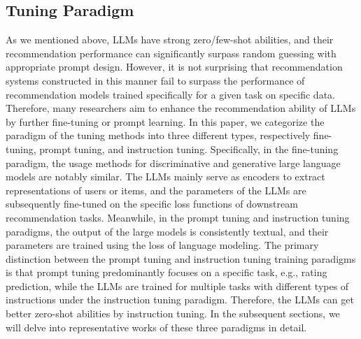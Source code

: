 \documentclass[sn-mathphys-num]{sn-jnl}%
\theoremstyle{thmstyleone}%
\theoremstyle{thmstyletwo}%
\theoremstyle{thmstylethree}%
\begin{document}
\subsection{Tuning Paradigm}
As we mentioned above, LLMs have strong zero/few-shot abilities, and their recommendation performance can significantly surpass random guessing with appropriate prompt design. However,  it is not surprising that recommendation systems constructed in this manner fail to surpass the performance of recommendation models trained specifically for a given task on specific data. Therefore, many researchers aim to enhance the recommendation ability of LLMs by further fine-tuning or prompt learning. In this paper, we categorize the paradigm of the tuning methods into three different types, respectively fine-tuning, prompt tuning, and instruction tuning. Specifically, in the fine-tuning paradigm, the usage methods for discriminative and generative large language models are notably similar. The LLMs mainly serve as encoders to extract representations of users or items, and the parameters of the LLMs are subsequently fine-tuned on the specific loss functions of downstream recommendation tasks. Meanwhile, in the prompt tuning and instruction tuning paradigms, the output of the large models is consistently textual, and their parameters are trained using the loss of language modeling. The primary distinction between the prompt tuning and instruction tuning training paradigms is that prompt tuning predominantly focuses on a specific task, e.g., rating prediction, while the LLMs are trained for multiple tasks with different types of instructions under the instruction tuning paradigm. Therefore, the LLMs can get better zero-shot abilities by instruction tuning. In the subsequent sections, we will delve into representative works of these three paradigms in detail.

\end{document}
